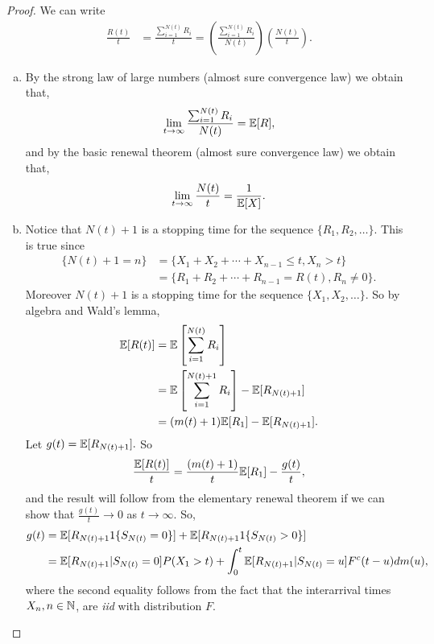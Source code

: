 \documentclass[a4paper,10pt,english]{article}
\begin{document}
\begin{proof}
We can write 
\begin{align*}
\frac{R(t)}{t}&=\frac{\sum_{i=1}^{N(t)}R_i}{t} =\left(\frac{\sum_{i=1}^{N(t)}R_i}{N(t)} \right) \left(\frac{N(t)}{t}\right).
\end{align*}
\begin{enumerate}[(a)]
\item By the strong law of large numbers (almost sure convergence law) we obtain that, 
\begin{align*}
	\lim_{t \to \infty} \frac{\sum_{i=1}^{N(t)}R_i}{N(t)} = \mathbb{E}[R],
\end{align*}
and by the basic renewal theorem (almost sure convergence law) we obtain that, 
\begin{align*}
	\lim_{t \to \infty} \frac{N(t)}{t} = \frac{1}{\mathbb{E}[X]}.
\end{align*} 
\item 
Notice that $ N(t)+1 $ is a stopping time for the sequence $\{R_1,R_2,\dots\}$. 
This is true since
\begin{align*}
	\{N(t)+1 = n\} &= \{X_1+X_2+\cdots+X_{n-1} \leq t , X_n > t \}\\
	&= \{R_1+R_2+\cdots+R_{n-1} = R(t) , R_n \neq 0 \}.
\end{align*}
Moreover $ N(t)+1 $ is a stopping time for the sequence $\{ X_1,X_2,\dots \}$. 
So by algebra and Wald's lemma,
\begin{align*}
\mathbb{E}[R(t)] &= \mathbb{E}\left[\sum_{i=1}^{N(t)}R_i\right] \\
&= \mathbb{E}\left[\sum_{i=1}^{N(t)+1}R_i\right]-\mathbb{E}[R_{N(t)+1}]\\ 
&= (m(t)+1)\mathbb{E}[R_1]-\mathbb{E}[R_{N(t)+1}].
\end{align*}
Let $g(t)=\mathbb{E}[R_{N(t)+1}].$ So 
\begin{equation}
 \frac{\mathbb{E}[R(t)]}{t} = \frac{(m(t)+1)}{t}\mathbb{E}[R_1]-\frac{g(t)}{t}, \nonumber
\end{equation}
and the result will follow from the elementary renewal theorem if we can show that $ \frac{g(t)}{t} \to 0 $ as $ t \to \infty. $ So,
\begin{align*}
g(t) &= \mathbb{E}[R_{N(t)+1}1\{S_{N(t)}=0\}]+\mathbb{E}[R_{N(t)+1}1\{S_{N(t)}>0\}]\\
&=\mathbb{E}[R_{N(t)+1}|S_{N(t)}=0]P(X_1>t)+\int_{0}^{t}\mathbb{E}[R_{N(t)+1}|S_{N(t)}=u]F^c(t-u)dm(u),
\end{align*}
where the second equality follows from the fact that the interarrival times $ X_n, n \in \mathbb{N} $, are \textit{iid} with distribution $ F $. \\ 

\end{enumerate}
\end{proof}
\end{document}
